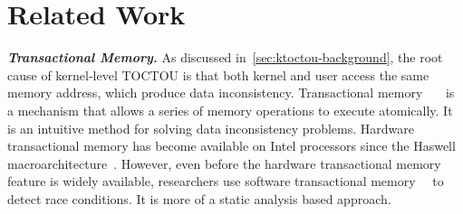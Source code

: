 \section{Related Work}
\label{sec:ktoctou-relatedwork}




%
%


\textbf{\textit{Transactional Memory.}} As discussed in~\autoref{sec:ktoctou-background}, the root cause of kernel-level TOCTOU is that both kernel and user access the same memory address, which produce data inconsistency. Transactional memory~\cite{shavit1997software}~\cite{rajwar2012intel}~\cite{herlihy1993transactional} is a mechanism that allows a series of memory operations to execute atomically. It is an intuitive method for solving data inconsistency problems. Hardware transactional memory has become available on Intel processors since the Haswell macroarchitecture~\cite{rajwar2012intel}. However, even before the hardware transactional memory feature is widely available, researchers use software transactional memory~\cite{kestor2014trex}~\cite{abadi2008semantics} to detect race conditions. It is more of a static analysis based approach.


